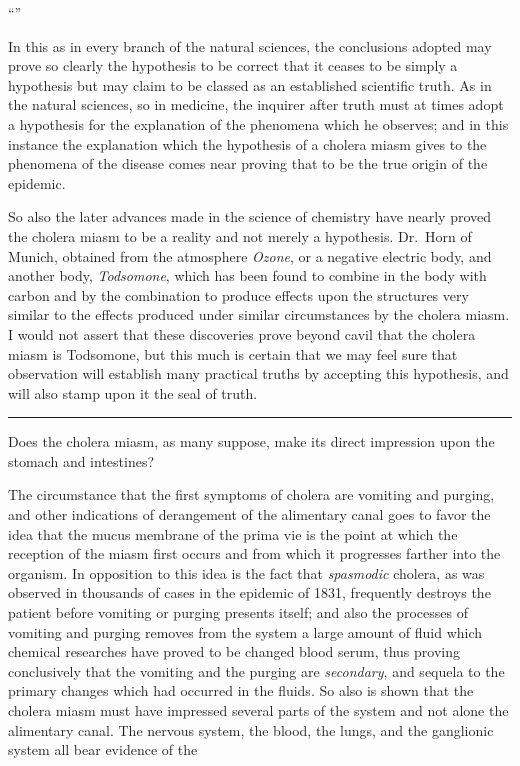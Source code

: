 ``''

In this as in every branch of the natural sciences, the conclusions
adopted may prove so clearly the hypothesis to be correct that it ceases
to be simply a hypothesis but may claim to be classed as an established
scientific truth. As in the natural sciences, so in medicine, the inquirer
after truth must at times adopt a hypothesis for the explanation of the
phenomena which he observes; and in this instance the explanation
which the hypothesis of a cholera miasm gives to the phenomena of
the disease comes near proving that to be the true origin of the
epidemic.

So also the later advances made in the science of chemistry have
nearly proved the cholera miasm to be a reality and not merely a
hypothesis. Dr.\ Horn of Munich, obtained from the atmosphere
\emph{Ozone}, or a negative electric body, and another body, \emph{Todsomone},
which has been found to combine in the body with carbon and by the
combination to produce effects upon the structures very similar to the
effects produced under similar circumstances by the cholera miasm. I
would not assert that these discoveries prove beyond cavil that the
cholera miasm is Todsomone, but this much is certain that we may feel
sure that observation will establish many practical truths by accepting
this hypothesis, and will also stamp upon it the seal of truth.

\plainbreak{1}

Does the cholera miasm, as many suppose, make its direct impression
upon the stomach and intestines?

The circumstance that the first symptoms of cholera are vomiting and
purging, and other indications of derangement of the alimentary canal
goes to favor the idea that the mucus membrane of the prima vie is the
point at which the reception of the miasm first occurs and from which
it progresses farther into the organism. In opposition to this idea is
the fact that \emph{spasmodic} cholera, as was observed in thousands of cases
in the epidemic of 1831, frequently destroys the patient before vomiting
or purging presents itself; and also the processes of vomiting and
purging removes from the system a large amount of fluid which chemical
researches have proved to be changed blood serum, thus proving
conclusively that the vomiting and the purging are \emph{secondary}, and
sequela to the primary changes which had occurred in the fluids. So
also is shown that the cholera miasm must have impressed several parts
of the system and not alone the alimentary canal. The nervous system,
the blood, the lungs, and the ganglionic system all bear evidence of the\endinput